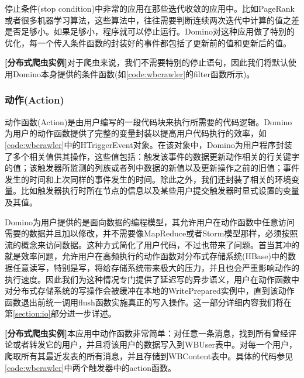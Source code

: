 停止条件(stop condition)中非常的应用在那些迭代收敛的应用中。比如PageRank或者很多机器学习算法，这些算法中，往往需要判断连续两次迭代中计算的值之差是否足够小。如果足够小，程序就可以停止运行。Domino对这种应用做了特别的优化，每一个传入条件函数的封装好的事件都包括了更新前的值和更新后的值。

\begin{Sbox}
\begin{minipage}{5in}
\setlength\parindent{1pc}
\textbf{[分布式爬虫实例]}对于爬虫来说，我们不需要特别的停止语句，因此我们将默认使用Domino本身提供的条件函数(如\ref{code:wbcrawler}的filter函数所示)。
\end{minipage}
\end{Sbox}
\shadowbox{\TheSbox}

\subsubsection{动作(Action)}
动作函数(Action)是由用户编写的一段代码块来执行所需要的代码逻辑。Domino为用户的动作函数提供了完整的变量封装以提高用户代码执行的效率，如\ref{code:wbcrawler}中的HTriggerEvent对象。在该对象中，Domino为用户程序封装了多个相关值供其操作，这些值包括：触发该事件的数据更新动作相关的行关键字的值；该触发器所监测的列族或者列中数据的新值以及更新操作之前的旧值；事件发生的时间和上次同样的事件发生的时间。除此之外，我们还封装了相关的环境变量。比如触发器执行时所在节点的信息以及某些用户提交触发器时显式设置的变量及其值。

Domino为用户提供的是面向数据的编程模型，其允许用户在动作函数中任意访问需要的数据并且加以修改，并不需要像MapReduce或者Storm模型那样，必须按照流的概念来访问数据。这种方式简化了用户代码，不过也带来了问题。首当其冲的就是效率问题，允许用户在高频执行的动作函数对分布式存储系统(HBase)中的数据任意读写，特别是写，将给存储系统带来极大的压力，并且也会严重影响动作的执行速度。因此我们为这种情况专门提供了延迟写的异步语义，用户在动作函数中对分布式存储系统的写操作会被缓冲在本地的WritePrepared实例中，直到该动作函数退出前统一调用flush函数实施真正的写入操作。这一部分详细内容我们将在第\ref{section:io}部分进一步详述。

\begin{Sbox}
\begin{minipage}{5in}
\setlength\parindent{1pc}
\textbf{[分布式爬虫实例]}本应用中动作函数非常简单：对任意一条消息，找到所有曾经评论或者转发它的用户，并且将该用户的数据写入到WBUser表中。对每一个用户，爬取所有其最近发表的所有消息，并且存储到WBContent表中。具体的代码参见\ref{code:wbcrawler}中两个触发器中的action函数。
\end{minipage}
\end{Sbox}
\shadowbox{\TheSbox}

